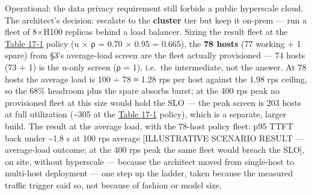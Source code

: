 Operational: the data privacy requirement still forbids a public
hyperscale cloud. The architect's decision: escalate to the
\textbf{cluster} tier but keep it on-prem --- run a fleet of 8×H100
replicas behind a load balancer. Sizing the result fleet at the \hyperref[tab:17.1]{Table 17-1} policy (u × ρ = 0.70 × 0.95 = 0.665), the \textbf{78 hosts} (77
working + 1 spare) from §3's average-load screen are the fleet actually
provisioned --- 74 hosts (73 + 1) is the u-only screen (ρ = 1), i.e.~the
intermediate, not the answer. At 78 hosts the average load is 100 ÷ 78 ≈
1.28 rps per host against the 1.98 rps ceiling, so the 68\% headroom
plus the spare absorbs burst; at the 400 rps peak no provisioned fleet
at this size would hold the SLO --- the peak screen is 203 hosts at full
utilization (\textasciitilde305 at the \hyperref[tab:17.1]{Table 17-1} policy), which is a
separate, larger build. The result at the average load, with the 78-host
policy fleet: p95 TTFT back under \textasciitilde1.8 s at 100 rps
average {[}ILLUSTRATIVE SCENARIO RESULT --- average-load outcome; at the
400 rps peak the same fleet would breach the SLO{]}, on site, without
hyperscale --- because the architect moved from single-host to
multi-host deployment --- one step up the ladder, taken because the
measured traffic trigger said so, not because of fashion or model size.
